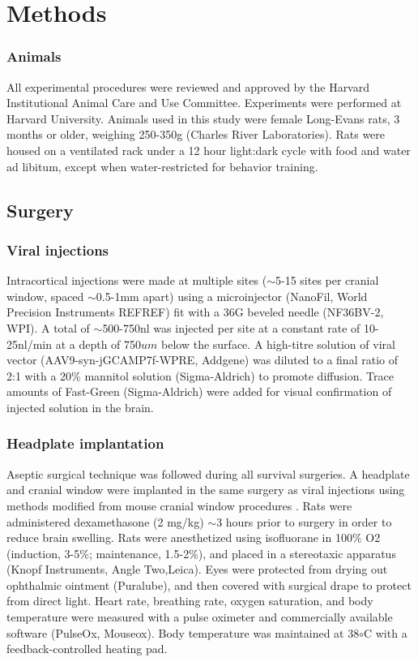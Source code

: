 \chapter{Methods}
\label{methods}



\subsection{Animals}
All experimental procedures were reviewed and approved by the Harvard Institutional Animal Care and Use Committee. Experiments were performed at Harvard University. Animals used in this study were female Long-Evans rats, 3 months or older, weighing 250-350g (Charles River Laboratories). Rats were housed on a ventilated rack under a 12 hour light:dark cycle with food and water ad libitum, except when water-restricted for behavior training. 

\section{Surgery}
\subsection{Viral injections}
Intracortical injections were made at multiple sites ($\sim$5-15 sites per cranial window, spaced $\sim$0.5-1mm apart) using a microinjector (NanoFil, World Precision Instruments REFREF) fit with a 36G beveled needle (NF36BV-2, WPI). A total of $\sim$500-750nl was injected per site at a constant rate of 10-25nl/min at a depth of 750$um$ below the surface. A high-titre solution of viral vector (AAV9-syn-jGCAMP7f-WPRE, Addgene) was diluted to a final ratio of 2:1 with a 20\% mannitol solution (Sigma-Aldrich) to promote diffusion. Trace amounts of Fast-Green (Sigma-Aldrich) were added for visual confirmation of injected solution in the brain.

\subsection{Headplate implantation}
Aseptic surgical technique was followed during all survival surgeries. A headplate and cranial window were implanted in the same surgery as viral injections using methods modified from mouse cranial window procedures \cite{Goldey2014}. Rats were administered dexamethasone (2 mg/kg) $\sim$3 hours prior to surgery in order to reduce brain swelling. Rats were anesthetized using isofluorane in 100\% O2 (induction, 3-5\%; maintenance, 1.5-2\%), and placed in a stereotaxic apparatus (Knopf Instruments, Angle Two,Leica). Eyes were protected from drying out ophthalmic ointment (Puralube), and then covered with surgical drape to protect from direct light. Heart rate, breathing rate, oxygen saturation, and body temperature were measured with a pulse oximeter and commercially available software (PulseOx, Mouseox). Body temperature was maintained at 38$\circ$C with a feedback-controlled heating pad. 


